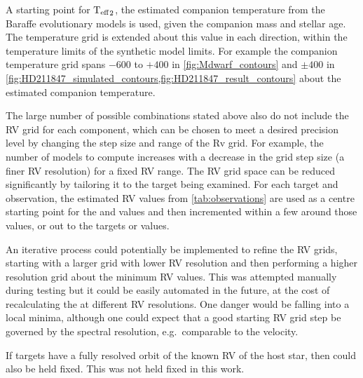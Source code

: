 A starting point for \({\textrm{T}_{\mathrm{eff}}}_{2}\), the estimated companion temperature from the Baraffe evolutionary models is used, given the companion mass and stellar age.
The temperature grid is extended about this value in each direction, within the temperature limits of the synthetic model limits.
For example the companion temperature grid spans \(-600\) to \(+400\)\K{} in \cref{fig:Mdwarf_contours} and \(\pm400\)\K{} in \cref{fig:HD211847_simulated_contours,fig:HD211847_result_contours} about the estimated companion temperature.

The large number of possible combinations stated above also do not include the {RV} grid for each component, which can be chosen to meet a desired precision level by changing the step size and range of the Rv grid.
For example, the number of models to compute increases  with a decrease in the grid step size (a finer {RV} resolution) for a fixed {RV} range.
The {RV} grid space can be reduced significantly by tailoring it to the target being examined.
For each target and observation, the estimated {RV} values from \cref{tab:observations} are used as a centre starting point for the \Rvone{} and \Rvtwo{} values and then incremented within a few {\fwhm} around those values, or out to the targets \Kone{} or \Ktwo{} values.

An iterative process could potentially be implemented to refine the {RV} grids, starting with a larger grid with lower {RV} resolution and then performing a higher resolution grid about the minimum \textchisquared{} {RV} values.
This was attempted manually during testing but it could be easily automated in the future, at the cost of recalculating the \textchisquared{} at different {RV} resolutions.
One danger would be falling into a local minima, although one could expect that a good starting {RV} grid step be governed by the spectral resolution, e.g.\ comparable to the {\fwhm} velocity.

If targets have a fully resolved orbit of the known {RV} of the host star, then \Rvone{} could also be held fixed.
This was not held fixed in this work.

